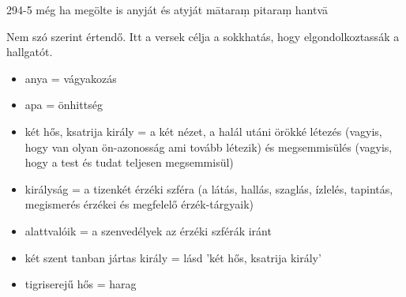 
\begin{notesdescription}

\item[{294-5}
{még ha megölte is anyját és atyját}
{mātaraṃ pitaraṃ hantvā}] \hfill\par

Nem szó szerint értendő. Itt a versek célja a sokkhatás, hogy elgondolkoztassák a hallgatót.

\begin{itemize}
\item anya = vágyakozás
\item apa = önhittség
\item két hős, ksatrija király = a két nézet, a halál utáni örökké létezés (vagyis, hogy van olyan ön-azonosság ami tovább létezik) és megsemmisülés (vagyis, hogy a test és tudat teljesen megsemmisül)
\item királyság = a tizenkét érzéki szféra (a látás, hallás, szaglás, ízlelés, tapintás, megismerés érzékei és megfelelő érzék-tárgyaik)
\item alattvalóik = a szenvedélyek az érzéki szférák iránt
\item két szent tanban jártas király = lásd 'két hős, ksatrija király'
\item tigriserejű hős = harag
\end{itemize}

\end{notesdescription}

